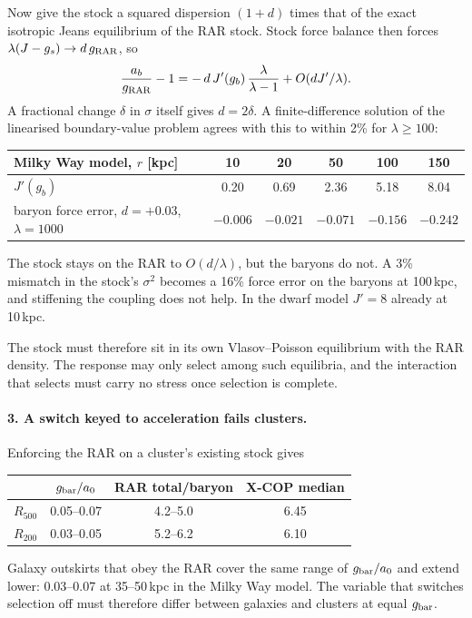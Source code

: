 Now give the stock a squared dispersion $(1+d)$ times that of the exact isotropic Jeans equilibrium of the RAR stock. Stock force balance then forces $\lambda(J-g_s)\to d\,g_{\rm RAR}$, so
\begin{equation}
\frac{a_b}{g_{\rm RAR}}-1=-\,d\,J'(g_b)\,\frac{\lambda}{\lambda-1}+O(dJ'/\lambda).
\end{equation}
A fractional change $\delta$ in $\sigma$ itself gives $d=2\delta$. A finite-difference solution of the linearised boundary-value problem agrees with this to within 2\% for $\lambda\ge100$:
\begin{center}\small
\begin{tabular}{lccccc}\toprule
Milky Way model, $r$ [kpc] & 10 & 20 & 50 & 100 & 150\\\midrule
$J'(g_b)$ & 0.20 & 0.69 & 2.36 & 5.18 & 8.04\\
baryon force error, $d=+0.03$, $\lambda=1000$ & $-0.006$ & $-0.021$ & $-0.071$ & $-0.156$ & $-0.242$\\
\bottomrule\end{tabular}\end{center}
The stock stays on the RAR to $O(d/\lambda)$, but the baryons do not. A 3\% mismatch in the stock's $\sigma^2$ becomes a 16\% force error on the baryons at 100\,kpc, and stiffening the coupling does not help. In the dwarf model $J'=8$ already at 10\,kpc.

The stock must therefore sit in its own Vlasov--Poisson equilibrium with the RAR density. The response may only select among such equilibria, and the interaction that selects must carry no stress once selection is complete.

\paragraph{3. A switch keyed to acceleration fails clusters.}
Enforcing the RAR on a cluster's existing stock gives
\begin{center}\small
\begin{tabular}{lccc}\toprule
& $g_{\rm bar}/a_0$ & RAR total/baryon & X-COP median\\\midrule
$R_{500}$ & 0.05--0.07 & 4.2--5.0 & 6.45\\
$R_{200}$ & 0.03--0.05 & 5.2--6.2 & 6.10\\\bottomrule
\end{tabular}\end{center}
Galaxy outskirts that obey the RAR cover the same range of $g_{\rm bar}/a_0$ and extend lower: 0.03--0.07 at 35--50\,kpc in the Milky Way model. The variable that switches selection off must therefore differ between galaxies and clusters at equal $g_{\rm bar}$.

